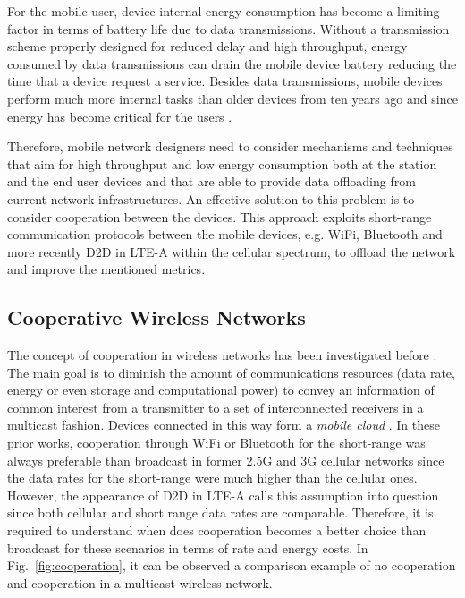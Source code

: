 For the mobile user, device internal energy consumption has become a limiting factor in terms of battery life due to data transmissions. Without a transmission scheme properly designed for reduced delay and high throughput, energy consumed by data transmissions can drain the mobile device battery reducing the time that a device request a service. Besides data transmissions, mobile devices perform much more internal tasks than older devices from ten years ago and since energy has become critical for the users \cite{fitzek2007mobile,ravi2008context,perruci2009energy}.

Therefore, mobile network designers need to consider mechanisms and techniques that aim for high throughput and low energy consumption both at the station and the end user devices and that are able to provide data offloading from current network infrastructures. An effective solution to this problem is to consider cooperation between the devices. This approach exploits short-range communication protocols between the mobile devices, e.g. \ac{WiFi}, Bluetooth and more recently \ac{D2D} in \ac{LTE-A} within the cellular spectrum, to offload the network and improve the mentioned metrics.

\subsection{Cooperative Wireless Networks}
The concept of cooperation in wireless networks has been investigated before \cite{fitzek2006cooperation,fitzek2007cognitive,fitzek2013mobile}. The main goal is to diminish the amount of communications resources (data rate, energy or even storage and computational power) to convey an information of common interest from a transmitter to a set of interconnected receivers in a multicast fashion. Devices connected in this way form a \textit{mobile cloud} \cite{fitzek2013mobile}. In these prior works, cooperation through \ac{WiFi} or Bluetooth for the short-range was always preferable than broadcast in former 2.5G and 3G cellular networks since the data rates for the short-range were much higher than the cellular ones. However, the appearance of \ac{D2D} in \ac{LTE-A} calls this assumption into question since both cellular and short range data rates are comparable. Therefore, it is required to understand when does cooperation becomes a better choice than broadcast for these scenarios in terms of rate and energy costs. In Fig.~\ref{fig:cooperation}, it can be observed a comparison example of no cooperation and cooperation in a multicast wireless network.

